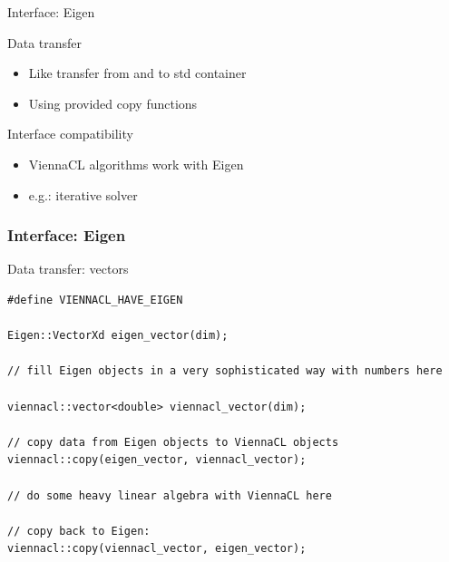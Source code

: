 \begin{frame}{Interface: Eigen}
\begin{block}{Data transfer}
 \begin{itemize}
  \item Like transfer from and to std container
  \item Using provided copy functions
 \end{itemize}
\end{block}

\begin{block}{Interface compatibility}
 \begin{itemize}
  \item ViennaCL algorithms work with Eigen
  \item e.g.: iterative solver
 \end{itemize}
\end{block}
\end{frame}



\begin{frame}[fragile]
\frametitle{Interface: Eigen}
\begin{block}{Data transfer: vectors}
  \begin{lstlisting}
#define VIENNACL_HAVE_EIGEN
 
Eigen::VectorXd eigen_vector(dim);
 
// fill Eigen objects in a very sophisticated way with numbers here
 
viennacl::vector<double> viennacl_vector(dim);
 
// copy data from Eigen objects to ViennaCL objects
viennacl::copy(eigen_vector, viennacl_vector);
 
// do some heavy linear algebra with ViennaCL here 
 
// copy back to Eigen:
viennacl::copy(viennacl_vector, eigen_vector);
  \end{lstlisting} 
\end{block}

\end{frame}



